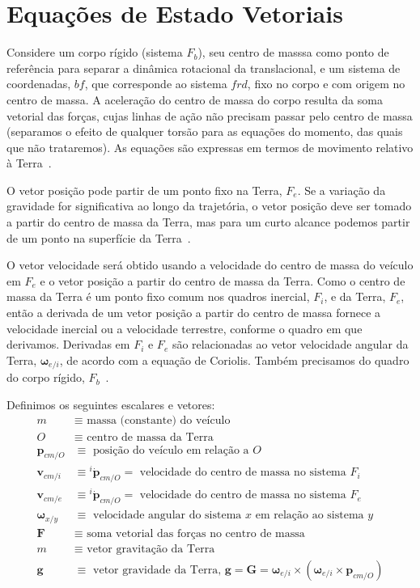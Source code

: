 \section{Equações de Estado Vetoriais}

Considere um corpo rígido (sistema \(F_{b}\)), seu centro de masssa como ponto de referência para separar a dinâmica rotacional da translacional, e um sistema de coordenadas, \(bf\), que corresponde ao sistema \(frd\), fixo no corpo e com origem no centro de massa. A aceleração do centro de massa do corpo resulta da soma vetorial das forças, cujas linhas de ação não precisam passar pelo centro de massa (separamos o efeito de qualquer torsão para as equações do momento, das quais que não trataremos). As equações são expressas em termos de movimento relativo à Terra~\cite{Stevens2016}.

O vetor posição pode partir de um ponto fixo na Terra, \(F_{e}\). Se a variação da gravidade for significativa ao longo da trajetória, o vetor posição deve ser tomado a partir do centro de massa da Terra, mas para um curto alcance podemos partir de um ponto na superfície da Terra~\cite{Stevens2016}.

O vetor velocidade será obtido usando a velocidade do centro de massa do veículo em \(F_{e}\) e o vetor posição a partir do centro de massa da Terra. Como o centro de massa da Terra é um ponto fixo comum nos quadros inercial, \(F_{i}\),  e da Terra, \(F_{e}\), então a derivada de um vetor posição a partir do centro de massa fornece a velocidade inercial ou a velocidade terrestre, conforme o quadro em que derivamos. Derivadas em \(F_{i}\) e \(F_{e}\) são relacionadas ao vetor velocidade angular da Terra, \(\mathbf{\omega}_{e/i}\), de acordo com a equação de Coriolis. Também precisamos do quadro do corpo rígido, \(F_{b}\)~\cite{Stevens2016}.

Definimos os seguintes escalares e vetores:
\begin{align*}
   m &\equiv \text{ massa (constante) do veículo} \\
   O &\equiv \text{ centro de massa da Terra} \\
   \mathbf{p}_{cm/O} &\equiv \text{ posição do veículo em relação a }O \\
   \mathbf{v}_{cm/i} &\equiv {^{i}\dot{\mathbf{p}}_{cm/O}} = \text{ velocidade do centro de massa no sistema }F_{i} \\
   \mathbf{v}_{cm/e} &\equiv {^{i}\dot{\mathbf{p}}_{cm/O}} = \text{ velocidade do centro de massa no sistema }F_{e}  \\
   \mathbf{\omega}_{x/y} &\equiv \text{ velocidade angular do sistema \(x\) em relação ao sistema \(y\)} \\
   \mathbf{F} &\equiv \text{ soma vetorial das forças no centro de massa} \\
   m &\equiv \text{ vetor gravitação da Terra} \\
   \mathbf{g} &\equiv \text{ vetor gravidade da Terra, }\mathbf{g} = \mathbf{G} = \mathbf{\omega}_{e/i} \times \left( \mathbf{\omega}_{e/i} \times  \mathbf{p}_{cm/O} \right) \\
\end{align*}

